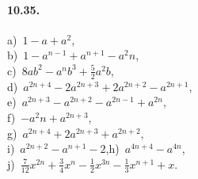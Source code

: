 \begin{multicols}{2}
\paragraph{10.35.} a)~$1-a+a^{2}$,\protect\\ b)~$1-a^{n-1}+a^{n+1}-a^{2}n$,\protect\\ c)~$8ab^2-a^nb^3+\frac{5}{2}a^2b$, \protect \\
d)~$a^{2n+4}-2a^{2n+3}+2a^{2n+2}-a^{2n+1}$,\protect\\ e)~$a^{2n+3}-a^{2n+2}-a^{2n-1}+a^{2n}$,\protect\\ f)~$-a^{2}n+a^{2n+3}$,\quad
\protect\\ g)~$a^{2n+4}+2a^{2n+3}+a^{2n+2}$,\protect\\ i)~$a^{2n+2}-a^{n+1}-2$,\quad h)~$a^{4n+4}-a^{4n}$,\protect\\
j)~$\frac{7}{12}x^{2n}+\frac{3}{4}x^{n}-\frac{1}{2}x^{3n}-\frac{1}{3}x^{n+1}+x$.
\end{multicols}
